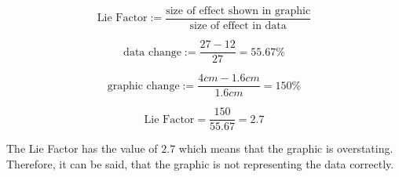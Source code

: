 

\renewcommand{\ex}{5}
\setcounter{section}{\ex}


    \maketitle

    \begin{exercise} \hfill
        \[\text{Lie Factor} := \frac{\text{size of effect shown in graphic}}{\text{size of effect in data}}\]

        \[\text{data change} := \frac{27-12}{27} = 55.67\%\]

        \[\text{graphic change} := \frac{4cm - 1.6cm}{1.6cm} = 150\%\]

        \[\text{Lie Factor} = \frac{150}{55.67} = 2.7\]
    
        \noindent
        The Lie Factor has the value of \(2.7\) which means that the graphic is overstating.
        Therefore, it can be said, that the graphic is not representing the data correctly.
    \end{exercise}

